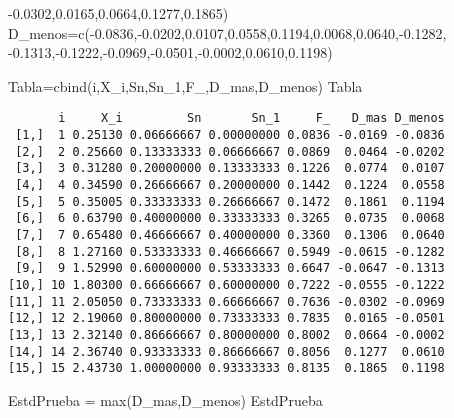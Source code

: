 \documentclass[
  a4paper,
  oneside,
  openany]{book}
\newenvironment{Shaded}{\begin{snugshade}}{\end{snugshade}}
\newcommand{\FloatTok}[1]{\textcolor[rgb]{0.00,0.00,0.81}{#1}}
\newcommand{\FunctionTok}[1]{\textcolor[rgb]{0.00,0.00,0.00}{#1}}
\newcommand{\NormalTok}[1]{#1}
\newcommand{\OtherTok}[1]{\textcolor[rgb]{0.56,0.35,0.01}{#1}}
\newcommand{\SpecialCharTok}[1]{\textcolor[rgb]{0.00,0.00,0.00}{#1}}
\begin{document}
\begin{Shaded}
\begin{Highlighting}[]
                \SpecialCharTok{{-}}\FloatTok{0.0302}\NormalTok{,}\FloatTok{0.0165}\NormalTok{,}\FloatTok{0.0664}\NormalTok{,}\FloatTok{0.1277}\NormalTok{,}\FloatTok{0.1865}\NormalTok{)}
\NormalTok{D\_menos}\OtherTok{=}\FunctionTok{c}\NormalTok{(}\SpecialCharTok{{-}}\FloatTok{0.0836}\NormalTok{,}\SpecialCharTok{{-}}\FloatTok{0.0202}\NormalTok{,}\FloatTok{0.0107}\NormalTok{,}\FloatTok{0.0558}\NormalTok{,}\FloatTok{0.1194}\NormalTok{,}\FloatTok{0.0068}\NormalTok{,}\FloatTok{0.0640}\NormalTok{,}\SpecialCharTok{{-}}\FloatTok{0.1282}\NormalTok{,}
          \SpecialCharTok{{-}}\FloatTok{0.1313}\NormalTok{,}\SpecialCharTok{{-}}\FloatTok{0.1222}\NormalTok{,}\SpecialCharTok{{-}}\FloatTok{0.0969}\NormalTok{,}\SpecialCharTok{{-}}\FloatTok{0.0501}\NormalTok{,}\SpecialCharTok{{-}}\FloatTok{0.0002}\NormalTok{,}\FloatTok{0.0610}\NormalTok{,}\FloatTok{0.1198}\NormalTok{)}

\NormalTok{Tabla}\OtherTok{=}\FunctionTok{cbind}\NormalTok{(i,X\_i,Sn,Sn\_1,F\_,D\_mas,D\_menos)                                                                                                                                                      }
\NormalTok{Tabla}
\end{Highlighting}
\end{Shaded}

\begin{verbatim}
       i     X_i         Sn       Sn_1     F_   D_mas D_menos
 [1,]  1 0.25130 0.06666667 0.00000000 0.0836 -0.0169 -0.0836
 [2,]  2 0.25660 0.13333333 0.06666667 0.0869  0.0464 -0.0202
 [3,]  3 0.31280 0.20000000 0.13333333 0.1226  0.0774  0.0107
 [4,]  4 0.34590 0.26666667 0.20000000 0.1442  0.1224  0.0558
 [5,]  5 0.35005 0.33333333 0.26666667 0.1472  0.1861  0.1194
 [6,]  6 0.63790 0.40000000 0.33333333 0.3265  0.0735  0.0068
 [7,]  7 0.65480 0.46666667 0.40000000 0.3360  0.1306  0.0640
 [8,]  8 1.27160 0.53333333 0.46666667 0.5949 -0.0615 -0.1282
 [9,]  9 1.52990 0.60000000 0.53333333 0.6647 -0.0647 -0.1313
[10,] 10 1.80300 0.66666667 0.60000000 0.7222 -0.0555 -0.1222
[11,] 11 2.05050 0.73333333 0.66666667 0.7636 -0.0302 -0.0969
[12,] 12 2.19060 0.80000000 0.73333333 0.7835  0.0165 -0.0501
[13,] 13 2.32140 0.86666667 0.80000000 0.8002  0.0664 -0.0002
[14,] 14 2.36740 0.93333333 0.86666667 0.8056  0.1277  0.0610
[15,] 15 2.43730 1.00000000 0.93333333 0.8135  0.1865  0.1198
\end{verbatim}

\begin{Shaded}
\begin{Highlighting}[]
\NormalTok{EstdPrueba }\OtherTok{=} \FunctionTok{max}\NormalTok{(D\_mas,D\_menos)}
\NormalTok{EstdPrueba}
\end{Highlighting}
\end{Shaded}
\end{document}
